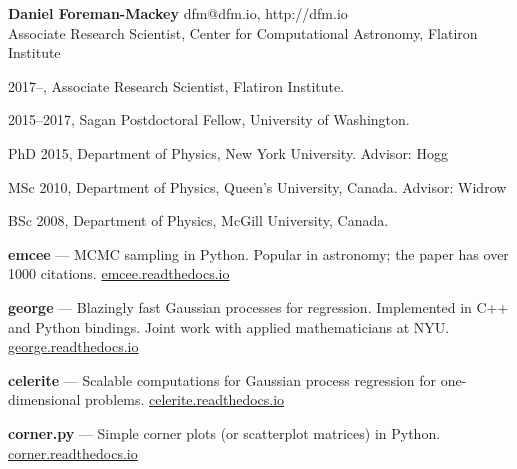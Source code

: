 \documentclass[12pt,letterpaper]{article}
\begin{document}
\thispagestyle{empty}\sloppy\sloppypar\raggedbottom

\textbf{\Large Daniel Foreman-Mackey} \hfill
\textsf{\small dfm@dfm.io, http://dfm.io} \\[0.5ex]
Associate Research Scientist, Center for Computational Astronomy, Flatiron Institute\\[0.5ex]

\begin{list}{}{\cvlist}
\item
2017--, Associate Research Scientist, Flatiron Institute.
\item
2015--2017, Sagan Postdoctoral Fellow, University of Washington.
\item
PhD 2015, Department of Physics, New York University. Advisor: Hogg
\item
MSc 2010, Department of Physics, Queen's University, Canada. Advisor: Widrow
\item
BSc 2008, Department of Physics, McGill University, Canada.
\end{list}

\begin{list}{}{\cvlist}

\end{list}

\begin{list}{}{\cvlist}

\item {\bf emcee} ---
    MCMC sampling in Python. Popular in astronomy;
    the paper has over 1000 citations.
    \url{emcee.readthedocs.io}

\item {\bf george} ---
    Blazingly fast Gaussian processes for regression. Implemented in C++ and
    Python bindings. Joint work with applied mathematicians at NYU.
    \url{george.readthedocs.io}

\item {\bf celerite} ---
    Scalable computations for Gaussian process regression for one-dimensional
    problems.
    \url{celerite.readthedocs.io}

\item {\bf corner.py} ---
    Simple corner plots (or scatterplot matrices) in Python.
    \url{corner.readthedocs.io}

\end{list}

\end{document}
